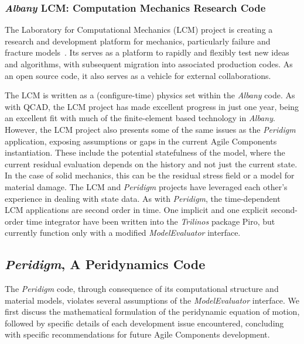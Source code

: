 \documentclass[pdf,ps2pdf,12pt,report]{SANDreport}
\theoremstyle{plain}
\theoremstyle{definition}
\theoremstyle{remark}
\numberwithin{equation}{section}
\begin{document}
\subsubsection{\emph{Albany} LCM: Computation Mechanics Research Code} \label{sec:albany:lcm}

The Laboratory for Computational Mechanics (LCM) project is creating a research and development platform for mechanics, particularly failure and fracture models~\cite{LCMWebPage:2011}. Its serves as a platform to rapidly and flexibly test new ideas and algorithms, with subsequent migration into associated production codes. As an open source code, it also serves as a vehicle for external collaborations.

The LCM is written as a (configure-time) physics set within the \emph{Albany} code. As with QCAD, the LCM project has made excellent progress in just one year, being an excellent fit with much of the finite-element based technology in \emph{Albany}. However, the LCM project also presents some of the same issues as the \emph{Peridigm} application, exposing assumptions or gaps in the current Agile Components instantiation. These include the potential statefulness of the model, where the current residual evaluation depends on the history and not just the current state. In the case of solid mechanics, this can be the residual stress field or a model for material damage. The LCM and \emph{Peridigm} projects have leveraged each other's experience in dealing with state data. As with \emph{Peridigm}, the time-dependent LCM applications are second order in time. One implicit and one explicit second-order time integrator have been written into the \emph{Trilinos} package Piro, but currently function only with a modified \emph{ModelEvaluator} interface.

\subsection{\emph{Peridigm}, A Peridynamics Code} \label{sec:peridigm}

The \emph{Peridigm} code, through consequence of its computational structure and material models, violates several assumptions of the \emph{ModelEvaluator} interface. We first discuss the mathematical formulation of the peridynamic equation of motion, followed by specific details of each development issue encountered, concluding with specific recommendations for future Agile Components development.
\end{document}
